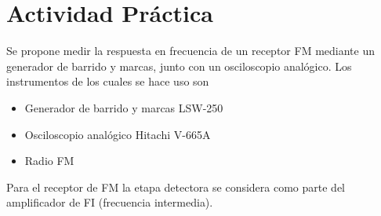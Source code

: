   \pagebreak
  \section{Actividad Práctica}
    Se propone medir la respuesta en frecuencia de un receptor FM mediante un generador de barrido y marcas, junto
    con un osciloscopio analógico. Los instrumentos de los cuales se hace uso son

    \begin{itemize}
      \item Generador de barrido y marcas LSW-250
      \item Osciloscopio analógico Hitachi V-665A
      \item Radio FM
    \end{itemize}

    Para el receptor de FM la etapa detectora se considera como parte del amplificador de FI (frecuencia intermedia).
    
    
    
    
